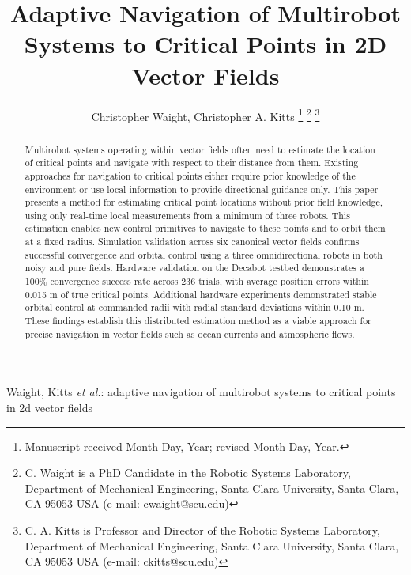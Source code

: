 \documentclass[lettersize,journal]{IEEEtran}
\begin{document}
\title{Adaptive Navigation of Multirobot Systems to Critical Points in 2D Vector Fields}
\author{Christopher Waight, Christopher A. Kitts 
\thanks{Manuscript received Month Day, Year; revised Month Day, Year.}
\thanks{C. Waight is a PhD Candidate in the Robotic Systems Laboratory, Department of Mechanical Engineering, Santa Clara University, Santa Clara, CA 95053 USA (e-mail: cwaight@scu.edu)}
\thanks{C. A. Kitts is Professor and Director of the Robotic Systems Laboratory, Department of Mechanical Engineering, Santa Clara University, Santa Clara, CA 95053 USA (e-mail: ckitts@scu.edu)}
}
%
{Waight, Kitts \MakeLowercase{\textit{et al.}: Adaptive Navigation of Multirobot Systems to Critical Points in 2D Vector Fields}}


\maketitle

\begin{abstract}
    Multirobot systems operating within vector fields often need to estimate the location of critical points and navigate with respect to their distance from them. Existing approaches for navigation to critical points either require prior knowledge of the environment or use local information to provide directional guidance only. This paper presents a method for estimating critical point locations without prior field knowledge, using only real-time local measurements from a minimum of three robots.
    This estimation enables new control primitives to navigate to these points and to orbit them at a fixed radius.
    Simulation validation across six canonical vector fields confirms successful convergence and orbital control using a three omnidirectional robots in both noisy and pure fields. Hardware validation on the Decabot testbed demonstrates a 100\% convergence success rate across 236 trials, with average position errors within 0.015 m of true critical points. Additional hardware experiments demonstrated stable orbital control at commanded radii with radial standard deviations within 0.10 m. These findings establish this distributed estimation method as a viable approach for precise navigation in vector fields such as ocean currents and atmospheric flows.  

\end{abstract}
\end{document}
